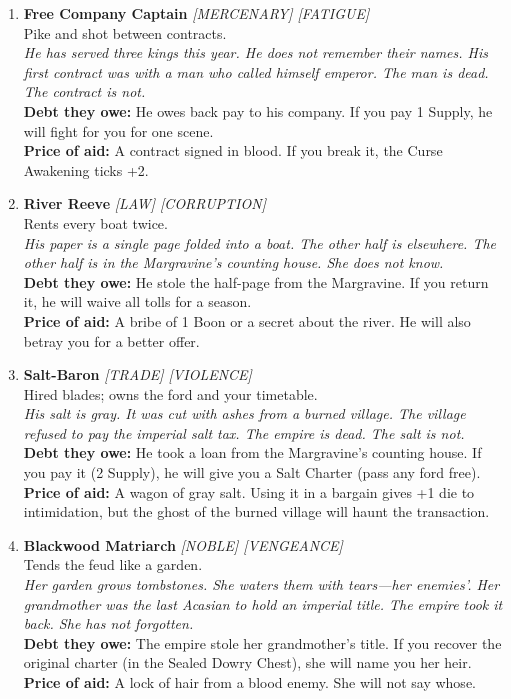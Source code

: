 \begin{enumerate}
\item \textbf{Free Company Captain} \hfill {} \textit{[MERCENARY] [FATIGUE]} \\
  Pike and shot between contracts. \\
  \textit{He has served three kings this year. He does not remember their names. His first contract was with a man who called himself emperor. The man is dead. The contract is not.} \\
  \textbf{Debt they owe:} He owes back pay to his company. If you pay 1 Supply, he will fight for you for one scene. \\
  \textbf{Price of aid:} A contract signed in blood. If you break it, the Curse Awakening ticks +2.

\item \textbf{River Reeve} \hfill {} \textit{[LAW] [CORRUPTION]} \\
  Rents every boat twice. \\
  \textit{His paper is a single page folded into a boat. The other half is elsewhere. The other half is in the Margravine's counting house. She does not know.} \\
  \textbf{Debt they owe:} He stole the half-page from the Margravine. If you return it, he will waive all tolls for a season. \\
  \textbf{Price of aid:} A bribe of 1 Boon or a secret about the river. He will also betray you for a better offer.

\item \textbf{Salt-Baron} \hfill {} \textit{[TRADE] [VIOLENCE]} \\
  Hired blades; owns the ford and your timetable. \\
  \textit{His salt is gray. It was cut with ashes from a burned village. The village refused to pay the imperial salt tax. The empire is dead. The salt is not.} \\
  \textbf{Debt they owe:} He took a loan from the Margravine's counting house. If you pay it (2 Supply), he will give you a Salt Charter (pass any ford free). \\
  \textbf{Price of aid:} A wagon of gray salt. Using it in a bargain gives +1 die to intimidation, but the ghost of the burned village will haunt the transaction.

\item \textbf{Blackwood Matriarch} \hfill {} \textit{[NOBLE] [VENGEANCE]} \\
  Tends the feud like a garden. \\
  \textit{Her garden grows tombstones. She waters them with tears---her enemies'. Her grandmother was the last Acasian to hold an imperial title. The empire took it back. She has not forgotten.} \\
  \textbf{Debt they owe:} The empire stole her grandmother's title. If you recover the original charter (in the Sealed Dowry Chest), she will name you her heir. \\
  \textbf{Price of aid:} A lock of hair from a blood enemy. She will not say whose.


\end{enumerate}
